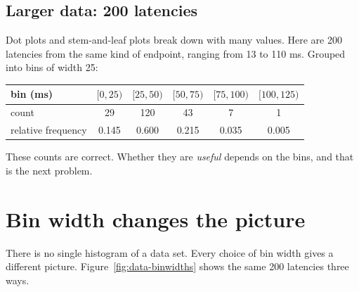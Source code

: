 \subsection{Larger data: 200 latencies}

Dot plots and stem-and-leaf plots break down with many values. Here are 200 latencies from
the same kind of endpoint, ranging from 13 to 110 ms. Grouped into bins of width 25:

\begin{center}
\begin{tabular}{lccccc}
\toprule
bin (ms) & $[0,25)$ & $[25,50)$ & $[50,75)$ & $[75,100)$ & $[100,125)$\\
\midrule
count & 29 & 120 & 43 & 7 & 1\\
relative frequency & 0.145 & 0.600 & 0.215 & 0.035 & 0.005\\
\bottomrule
\end{tabular}
\end{center}

These counts are correct. Whether they are \emph{useful} depends on the bins, and that is
the next problem.

\section{Bin width changes the picture}
\label{sec:data-binwidth}

There is no single histogram of a data set. Every choice of bin width gives a different
picture. Figure~\ref{fig:data-binwidths} shows the same 200 latencies three ways.

